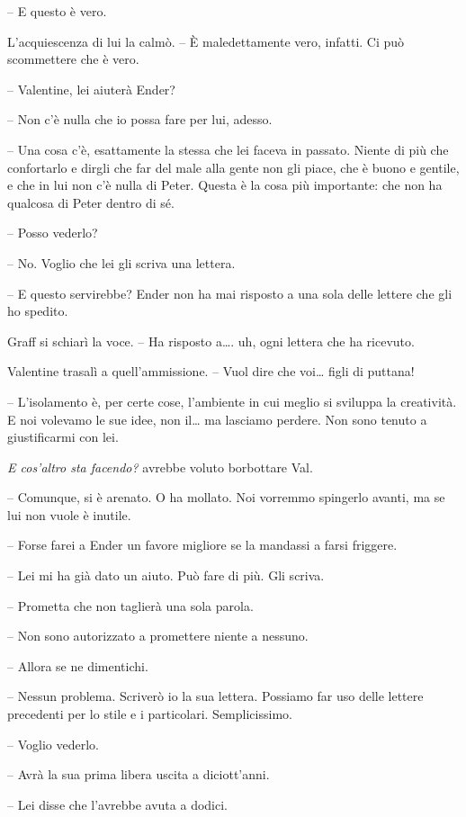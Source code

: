 {-- E questo è vero.}

{L'acquiescenza di lui la calmò. -- È maledettamente vero, infatti. Ci
	può scommettere che è vero.}

{-- Valentine, lei aiuterà Ender?}

{-- Non c'è nulla che io possa fare per lui, adesso.}

{-- Una cosa c'è, esattamente la stessa che lei faceva in passato.
	Niente di più che confortarlo e dirgli che far del male alla gente non
	gli piace, che è buono e gentile, e che in lui non c'è nulla di Peter.
	Questa è la cosa più importante: che non ha qualcosa di Peter dentro di
	sé.}

{-- Posso vederlo?}

{-- No. Voglio che lei gli scriva una lettera.}

{-- E questo servirebbe? Ender non ha mai risposto a una sola delle
	lettere che gli ho spedito.}

{Graff si schiarì la voce. -- Ha risposto a\ldots. uh, ogni lettera che
	ha ricevuto.}

{Valentine trasalì a quell'ammissione. -- Vuol dire che voi\ldots{}
	figli di puttana!}

{-- L'isolamento è, per certe cose, l'ambiente in cui meglio si sviluppa
	la creatività. E noi volevamo le sue idee, non il\ldots{} ma lasciamo
	perdere. Non sono tenuto a giustificarmi con lei.}

\emph{{E cos'altro sta facendo? }}{avrebbe voluto borbottare Val.}

{-- Comunque, si è arenato. O ha mollato. Noi vorremmo spingerlo avanti,
	ma se lui non vuole è inutile.}

{-- Forse farei a Ender un favore migliore se la mandassi a farsi
	friggere.}

{-- Lei mi ha già dato un aiuto. Può fare di più. Gli scriva.}

{-- Prometta che non taglierà una sola parola.}

{-- Non sono autorizzato a promettere niente a nessuno.}

{-- Allora se ne dimentichi.}

{-- Nessun problema. Scriverò io la sua lettera. Possiamo far uso delle
	lettere precedenti per lo stile e i particolari. Semplicissimo.}

{-- Voglio vederlo.}

{-- Avrà la sua prima libera uscita a diciott'anni.}

{-- Lei disse che l'avrebbe avuta a dodici.}

